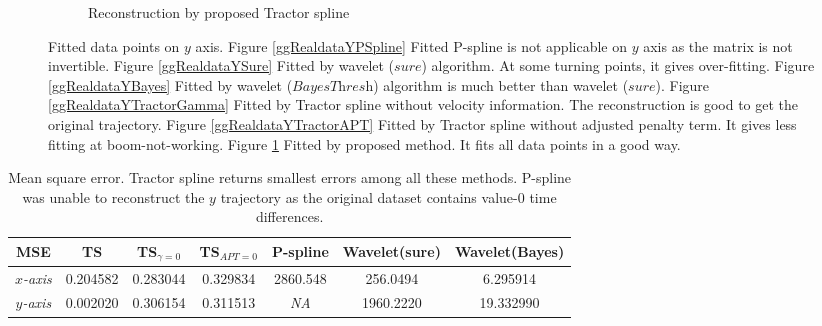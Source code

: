 \begin{figure}
\begin{subfigure}{0.45\textwidth}
    \caption{Reconstruction by proposed Tractor spline}\label{ggRealdataYTractor}
    \end{subfigure}
\caption{Fitted data points on $y$ axis. Figure \ref{ggRealdataYPSpline} Fitted P-spline is not applicable on $y$ axis as the matrix is not invertible. Figure \ref{ggRealdataYSure} Fitted by wavelet ($\textit{sure}$) algorithm. At some turning points, it gives over-fitting. Figure \ref{ggRealdataYBayes} Fitted by wavelet ($\textit{BayesThresh}$) algorithm is much better than wavelet ($\textit{sure}$). Figure \ref{ggRealdataYTractorGamma} Fitted by Tractor spline without velocity information. The reconstruction is good to get the original trajectory. Figure \ref{ggRealdataYTractorAPT} Fitted by Tractor spline without adjusted penalty term. It gives less fitting at boom-not-working. Figure \ref{ggRealdataYTractor} Fitted by proposed method. It fits all data points in a good way.}\label{1dy}
 \end{figure}



\begin{table}
\caption{Mean square error. Tractor spline returns smallest errors among all these methods. P-spline was unable to reconstruct the $y$ trajectory as the original dataset contains value-$0$ time differences.} \label{1dxymse}
	\setlength\tabcolsep{1.5pt}
\begin{center}
 	\begin{tabular}{|c|c|c|c|c|c|c|}
 		\hline
 		MSE   &  TS & TS$_{\gamma=0}$ & TS$_{APT=0}$   & P-spline & Wavelet(sure) & Wavelet(Bayes)\\ \hline
	\textit{$x$-\mbox{axis}}    &  0.204582 & 0.283044 & 0.329834     & 2860.548   & 256.0494  & 6.295914  \\ \hline
	\textit{$y$-\mbox{axis}}    &  0.002020 & 0.306154 & 0.311513     & \textit{NA} & 1960.2220 & 19.332990  \\ \hline
 	\end{tabular}
 \end{center}
\end{table}

